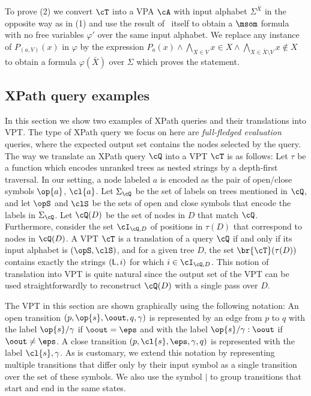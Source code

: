 To prove (2) we convert $\cT$ into a VPA $\cA$ with input alphabet $\Sigma^{\bar{X}}$ in the opposite way as in (1) and use the result of~\cite{AlurM04} itself to obtain a $\msom$ formula with no free variables $\varphi'$ over the same input alphabet. We replace any instance of $P_{(a, V)}(x)$ in $\varphi$ by the expression $P_a(x) \wedge \bigwedge_{X\in V}x\in X\wedge \bigwedge_{X\in\bar{X}\setminus V}x\not\in X$ to obtain a formula $\varphi(\bar{X})$ over $\Sigma$ which proves the statement.


\subsection{XPath query examples}
In this section we show two examples of XPath queries and their translations into VPT. 
The type of XPath query we focus on here are {\em full-fledged evaluation} queries, where the expected output set contains the nodes selected by the query. 
The way we translate an XPath query $\cQ$ into a VPT $\cT$ is as follows:  
Let $\tau$ be a function which encodes unranked trees as nested strings by a depth-first traversal. 
In our setting, a node labeled $a$ is encoded as the pair of open/close symbols $\op{a}$, $\cl{a}$. 
Let $\Sigma_{\cQ}$ be the set of labels on trees mentioned in $\cQ$, and let $\opS$ and $\clS$ be the sets of open and close symbols that encode the labels in $\Sigma_{\cQ}$. 
Let $\cQ(D)$ be the set of nodes in $D$ that match $\cQ$. 
Furthermore, consider the set $\cI_{\cQ, D}$ of positions in $\tau(D)$ that correspond to nodes in $\cQ(D)$.
A VPT $\cT$ is a translation of a query $\cQ$ if and only if its input alphabet is $(\opS, \clS)$, and for a given tree $D$, the set $\br{\cT}(\tau(D))$ contains exactly the strings $({\sf L}, i)$ for which $i\in\cI_{\cQ, D}$. 
This notion of translation into VPT is quite natural since the output set of the VPT can be used straightforwardly to reconstruct $\cQ(D)$ with a single pass over $D$.

The VPT in this section are shown graphically using the following notation: An open transition $(p,\op{s},\oout,q,\gamma)$ is represented by an edge from $p$ to $q$ with the label $\op{s} / \gamma$ if $\oout = \eps$ and with the label $\op{s} / \gamma : \oout$ if $\oout \neq \eps$. A close transition $(p,\cl{s},\eps,\gamma,q)$ is represented with the label $\cl{s}, \gamma$. As is customary, we extend this notation by representing multiple transitions that differ only by their input symbol as a single transition over the set of these symbols. We also use the symbol $|$ to group transitions that start and end in the same states.

